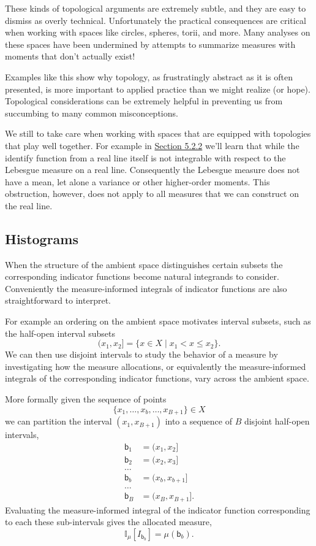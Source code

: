 \documentclass[
  letterpaper,
  DIV=11,
  numbers=noendperiod]{scrartcl}
\begin{document}
These kinds of topological arguments are extremely subtle, and they are
easy to dismiss as overly technical. Unfortunately the practical
consequences are critical when working with spaces like circles,
spheres, torii, and more. Many analyses on these spaces have been
undermined by attempts to summarize measures with moments that don't
actually exist!

Examples like this show why topology, as frustratingly abstract as it is
often presented, is more important to applied practice than we might
realize (or hope). Topological considerations can be extremely helpful
in preventing us from succumbing to many common misconceptions.

We still to take care when working with spaces that are equipped with
topologies that play well together. For example in
\href{@sec:practical_lebesgue}{Section 5.2.2} we'll learn that while the
identify function from a real line itself is not integrable with respect
to the Lebesgue measure on a real line. Consequently the Lebesgue
measure does not have a mean, let alone a variance or other higher-order
moments. This obstruction, however, does not apply to all measures that
we can construct on the real line.

\hypertarget{histograms}{%
\subsection{Histograms}\label{histograms}}

When the structure of the ambient space distinguishes certain subsets
the corresponding indicator functions become natural integrands to
consider. Conveniently the measure-informed integrals of indicator
functions are also straightforward to interpret.

For example an ordering on the ambient space motivates interval subsets,
such as the half-open interval subsets \[
( x_{1}, x_{2} ] = \{ x \in X \mid x_{1} < x \le x_{2} \}.
\] We can then use disjoint intervals to study the behavior of a measure
by investigating how the measure allocations, or equivalently the
measure-informed integrals of the corresponding indicator functions,
vary across the ambient space.

More formally given the sequence of points \[
\{ x_{1}, \ldots, x_{b}, \ldots, x_{B + 1} \} \in X
\] we can partition the interval \((x_{1}, x_{B + 1})\) into a sequence
of \(B\) disjoint half-open intervals, \begin{align*}
\mathsf{b}_{1} &= ( x_{1}, x_{2} ]
\\
\mathsf{b}_{2} &= ( x_{2}, x_{3} ]
\\
\ldots&
\\
\mathsf{b}_{b} &= ( x_{b}, x_{b + 1} ]
\\
\ldots&
\\
\mathsf{b}_{B} &= ( x_{B}, x_{B + 1} ].
\end{align*} Evaluating the measure-informed integral of the indicator
function corresponding to each these sub-intervals gives the allocated
measure, \[
\mathbb{I}_{\mu}[I_{\mathsf{b}_{b}}]
= \mu(\mathsf{b}_{b}).
\]
\end{document}
